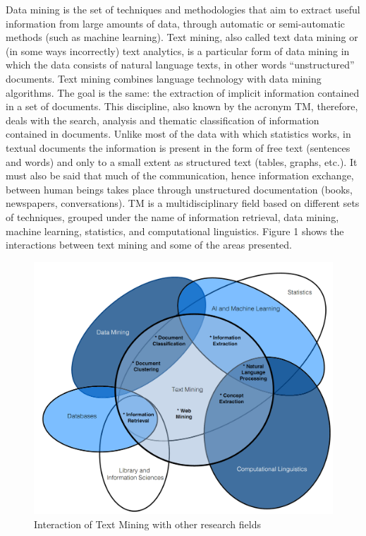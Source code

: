 \documentclass[
]{book}
\begin{document}
Data mining is the set of techniques and methodologies that aim to extract useful information from large amounts of data, through automatic or semi-automatic methods (such as machine learning).
Text mining, also called text data mining or (in some ways incorrectly) text analytics, is a particular form of data mining in which the data consists of natural language texts, in other words ``unstructured'' documents. Text mining combines language technology with data mining algorithms. The goal is the same: the extraction of implicit information contained in a set of documents.
This discipline, also known by the acronym TM, therefore, deals with the search, analysis and thematic classification of information contained in documents. Unlike most of the data with which statistics works, in textual documents the information is present in the form of free text (sentences and words) and only to a small extent as structured text (tables, graphs, etc.). It must also be said that much of the communication, hence information exchange, between human beings takes place through unstructured documentation (books, newspapers, conversations).
TM is a multidisciplinary field based on different sets of techniques, grouped under the name of information retrieval, data mining, machine learning, statistics, and computational linguistics. Figure 1 shows the interactions between text mining and some of the areas presented.

\begin{figure}
\includegraphics[width=30in]{tmimg} \caption{Interaction of Text Mining with other research fields}\label{fig:unnamed-chunk-1}
\end{figure}
\end{document}
